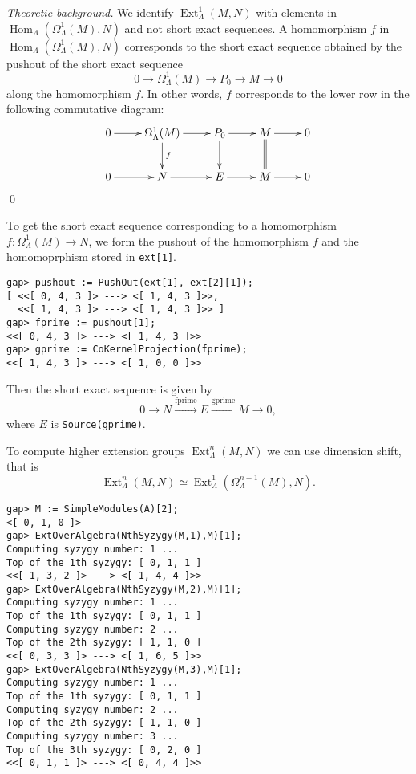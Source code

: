\documentclass{amsart}
\newcommand{\Hom}{\operatorname{Hom}\nolimits}
\newcommand{\Ext}{\operatorname{Ext}\nolimits}
\theoremstyle{definition}
\newcommand{\code}[1]{\texttt{#1}}
\theoremstyle{theoretic}
\newenvironment{theoback}
{\medskip\small\textit{Theoretic background.} }
{\qed\par\medskip}
\begin{document}
\begin{theoback}
We identify $\Ext^1_\Lambda(M,N)$ with elements in
$\Hom_\Lambda(\Omega^1_\Lambda(M),N)$ and not short exact sequences.
A homomorphism $f$ in $\Hom_\Lambda(\Omega^1_\Lambda(M),N)$
corresponds to the short exact sequence obtained by the pushout of
the short exact sequence 
\[0\to \Omega^1_\Lambda(M)\to P_0 \to M\to 0\]
along the homomorphism $f$.  In other words, $f$ corresponds to the
lower row in the following commutative diagram:
\[\xymatrix{
0\ar[r] & \Omega^1_\Lambda(M)\ar[r]\ar[d]^f & P_0\ar[r]\ar[d] &
M\ar[r]\ar@{=}[d] & 0\\
0\ar[r] & N \ar[r] & E\ar[r] & M\ar[r] & 0
}\]
\end{theoback}
To get the short exact sequence corresponding to a homomorphism
$f\colon \Omega^1_\Lambda(M)\to N$, we form the pushout of the
homomorphism $f$ and the homomoprphism stored in \code{ext[1]}. 
\begin{verbatim}
gap> pushout := PushOut(ext[1], ext[2][1]);
[ <<[ 0, 4, 3 ]> ---> <[ 1, 4, 3 ]>>,
  <<[ 1, 4, 3 ]> ---> <[ 1, 4, 3 ]>> ]
gap> fprime := pushout[1];     
<<[ 0, 4, 3 ]> ---> <[ 1, 4, 3 ]>>
gap> gprime := CoKernelProjection(fprime); 
<<[ 1, 4, 3 ]> ---> <[ 1, 0, 0 ]>>
\end{verbatim}
Then the short exact sequence is given by 
\[0\to N\xrightarrow{\textrm{fprime}} E\xrightarrow{\textrm{gprime}}
M\to 0,\]
where $E$ is \code{Source(gprime)}.  

To compute higher extension groups $\Ext^n_\Lambda(M,N)$ we can use
dimension shift, that is 
\[\Ext^n_\Lambda(M,N)\simeq \Ext^1_\Lambda(\Omega^{n-1}_\Lambda(M),N).\]
\begin{verbatim}
gap> M := SimpleModules(A)[2];
<[ 0, 1, 0 ]>
gap> ExtOverAlgebra(NthSyzygy(M,1),M)[1];
Computing syzygy number: 1 ...
Top of the 1th syzygy: [ 0, 1, 1 ]
<<[ 1, 3, 2 ]> ---> <[ 1, 4, 4 ]>>
gap> ExtOverAlgebra(NthSyzygy(M,2),M)[1];
Computing syzygy number: 1 ...
Top of the 1th syzygy: [ 0, 1, 1 ]
Computing syzygy number: 2 ...
Top of the 2th syzygy: [ 1, 1, 0 ]
<<[ 0, 3, 3 ]> ---> <[ 1, 6, 5 ]>>
gap> ExtOverAlgebra(NthSyzygy(M,3),M)[1];
Computing syzygy number: 1 ...
Top of the 1th syzygy: [ 0, 1, 1 ]
Computing syzygy number: 2 ...
Top of the 2th syzygy: [ 1, 1, 0 ]
Computing syzygy number: 3 ...
Top of the 3th syzygy: [ 0, 2, 0 ]
<<[ 0, 1, 1 ]> ---> <[ 0, 4, 4 ]>>
\end{verbatim}
\end{document}
